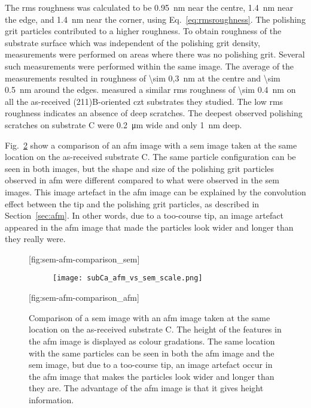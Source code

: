 The \ac{rms} roughness was calculated to be \SI{0.95}{\nano\metre} near the centre, \SI{1.4}{\nano\metre} near the edge, and \SI{1.4}{\nano\metre} near the corner, using Eq.~\ref{eq:rmsroughness}. The polishing grit particles contributed to a higher roughness. To obtain  roughness of the substrate surface which was independent of the polishing grit density, measurements were performed on areas where there was no polishing grit. Several such measurements were performed within the same image. The average of the measurements resulted in  roughness of \SI{\sim 0,3}{\nano\metre} at the centre and \SI{\sim 0.5}{\nano\metre} around the edges. \citet{benson2015as-received} measured a similar \ac{rms} roughness of \SI{\sim 0.4}{\nano\metre} on all the as-received (211)B-oriented \ac{czt} substrates they studied. The low \ac{rms} roughness indicates an absence of deep scratches. The deepest observed polishing scratches on substrate C were \SI{0,2}{\micro\metre} wide and only \SI{1}{\nano\metre} deep. 

Fig.~\ref{fig:sem-afm-comparison} show a comparison of an \ac{afm} image with a \ac{sem} image taken at the same location on the as-received substrate C. The same particle configuration can be seen in both images, but the shape and size of the polishing grit particles observed in \ac{afm} were different compared to what were observed in the \ac{sem} images. This image artefact in the \ac{afm} image can be explained by the convolution effect between the tip and the polishing grit particles, as described in Section~\ref{sec:afm}. In other words, due to a too-course tip, an image artefact appeared in the \ac{afm} image that made the particles look wider and longer than they really were. 

\begin{figure}[htbp]
    \centering
    [fig:sem-afm-comparison_sem]
    \hfill\hfill
    \begin{subfigure}[c]{0.04\linewidth}
        \label{fig:subCa_afm_vs_sem_scale}\captionsetup{list=no}
        \texttt{[image: subCa\_afm\_vs\_sem\_scale.png]}
    \end{subfigure}
    \hfill
    [fig:sem-afm-comparison_afm]
    \caption[Comparison of an \ac{afm} image with a \ac{sem} image taken at the same location on substrate C.]{Comparison of  a \ac{sem} image with  an \ac{afm} image taken at the same location on the as-received substrate C. The height of the features in the \ac{afm} image is displayed as colour gradations. The same location with the same particles can be seen in both the \ac{afm} image and the \ac{sem} image, but due to a too-course tip, an image artefact occur in the \ac{afm} image that makes the particles look wider and longer than they are. The advantage of the \ac{afm} image is that it gives height information.}
    \label{fig:sem-afm-comparison}
\end{figure}

